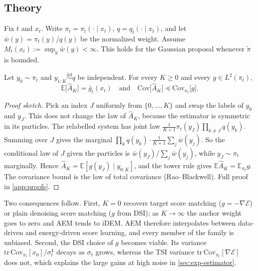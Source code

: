 \subsection{Theory}
\label{sec:theory}
Fix $t$ and $x_t$. Write $\pi_t=\pi_t(\cdot\mid x_t)$, $q=q_t(\cdot\mid x_t)$, and let $\bar w(y)=\pi_t(y)/q(y)$ be the normalized weight.
Assume $M_t(x_t):=\sup_y \bar w(y)<\infty$. This holds for the Gaussian proposal whenever $\tilde\pi$ is bounded.

\begin{theorem}
\label{thm:unbiased}
Let $y_0\sim\pi_t$ and $y_{1:K}\overset{\text{iid}}{\sim}q$ be independent. For every $K\ge 0$ and every $g\in L^2(\pi_t)$,
\[
\mathbb{E}\big[\widehat A_K\big]=\bar g_t(x_t)
\quad\text{and}\quad
\mathrm{Cov}\big[\widehat A_K\big]\preceq \mathrm{Cov}_{\pi_t}\big[g\big].
\]
\end{theorem}
\begin{proof}[Proof sketch]
Pick an index $J$ uniformly from $\{0,\dots,K\}$ and swap the labels of $y_0$ and $y_J$.
This does not change the law of $\widehat A_K$, because the estimator is symmetric in its particles.
The relabelled system has joint law $\frac{1}{K+1}\pi_t(y_J)\prod_{k\neq J}q(y_k)$.
Summing over $J$ gives the marginal $\prod_k q(y_k)\cdot\frac{1}{K+1}\sum_j\bar w(y_j)$.
So the conditional law of $J$ given the particles is $\bar w(y_J)/\sum_j \bar w(y_j)$, while $y_J\sim\pi_t$ marginally.
Hence $\widehat A_K=\mathbb{E}[g(y_J)\mid y_{0:K}]$, and the tower rule gives $\mathbb{E}\widehat A_K=\mathbb{E}_{\pi_t}g$.
The covariance bound is the law of total covariance (Rao--Blackwell). Full proof in \cref{app:proofs}.
\end{proof}

Two consequences follow. First, $K=0$ recovers target score matching ($g=-\nabla\mathcal{E}$) or plain denoising score matching ($g$ from DSI); as $K\to\infty$ the anchor weight goes to zero and AEM tends to iDEM. AEM therefore interpolates between data-driven and energy-driven score learning, and every member of the family is unbiased.
Second, the DSI choice of $g$ becomes viable. Its variance $\mathrm{tr}\,\mathrm{Cov}_{\pi_t}[x_0]/\sigma_t^4$ decays as $\sigma_t$ grows, whereas the TSI variance $\mathrm{tr}\,\mathrm{Cov}_{\pi_t}[\nabla\mathcal{E}]$ does not, which explains the large gains at high noise in \cref{sec:exp-estimator}.

